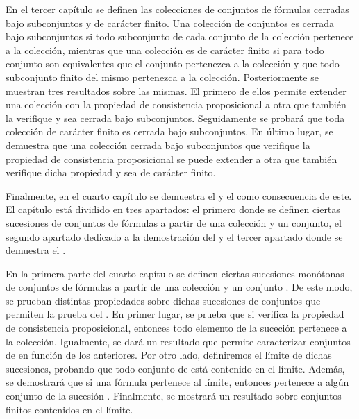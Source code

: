\begin{isabellebody}
\begin{isamarkuptext}
  En el tercer capítulo se definen las colecciones de conjuntos de fórmulas
  cerradas bajo subconjuntos y de carácter finito. Una colección de conjuntos 
  es cerrada bajo subconjuntos si todo subconjunto de cada conjunto de la 
  colección pertenece a la colección, mientras que una colección es de 
  carácter finito si para todo conjunto son equivalentes que el conjunto
  pertenezca a la colección y que todo subconjunto finito del mismo pertenezca
  a la colección. Posteriormente se muestran tres resultados sobre las mismas. 
  El primero de ellos permite extender una colección con la propiedad de 
  consistencia proposicional a otra que también la verifique y sea cerrada bajo 
  subconjuntos. Seguidamente se probará que toda colección de carácter finito
  es cerrada bajo subconjuntos. En último lugar, se demuestra que una colección
  cerrada bajo subconjuntos que verifique la propiedad de consistencia 
  proposicional se puede extender a otra que también verifique dicha propiedad 
  y sea de carácter finito. 

  Finalmente, en el cuarto capítulo se demuestra el  y el  como consecuencia de este. El capítulo 
  está dividido en tres apartados: el primero donde se definen ciertas 
  sucesiones de conjuntos de fórmulas a partir de una colección y un conjunto, 
  el segundo apartado dedicado a la demostración del  y el tercer apartado donde se demuestra el . 

  En la primera parte del cuarto capítulo se definen ciertas sucesiones 
  monótonas  de conjuntos de fórmulas a partir de una colección  y un 
  conjunto . De este modo, se prueban distintas propiedades sobre dichas 
  sucesiones de conjuntos que permiten la prueba del . En primer lugar, se prueba que si  verifica la propiedad de 
  consistencia proposicional, entonces todo elemento de la suceción  
  pertenece a la colección. Igualmente, se dará un resultado que permite 
  caracterizar conjuntos de  en función de los anteriores. Por otro lado, 
  definiremos el límite de dichas sucesiones, probando que todo conjunto de 
   está contenido en el límite. Además, se demostrará que si una fórmula 
  pertenece al límite, entonces pertenece a algún conjunto de la sucesión . 
  Finalmente, se mostrará un resultado sobre conjuntos finitos contenidos en el 
  límite.


\end{isamarkuptext}
\end{isabellebody}
